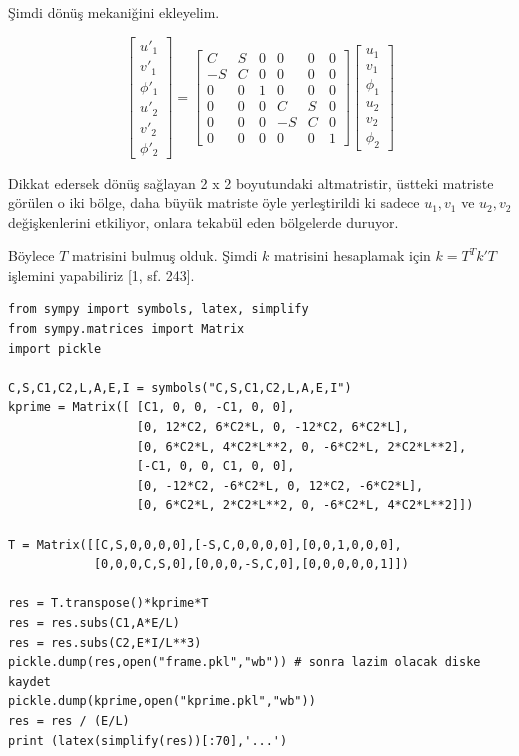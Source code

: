 \documentclass[12pt,fleqn]{article}\usepackage{../../common}
\begin{document}
Şimdi dönüş mekaniğini ekleyelim.

$$
\left[\begin{array}{ccc}
u'_1 \\ v'_1 \\ \phi'_1 \\ u'_2 \\ v'_2 \\ \phi'_2 
\end{array}\right] =
\left[\begin{array}{cccccc}
C & S & 0 & 0 & 0 & 0 \\
-S & C & 0 & 0 & 0 & 0 \\
0 & 0 & 1 & 0 & 0 & 0 \\
0 & 0 & 0 & C & S & 0 \\
0 & 0 & 0 & -S & C & 0 \\
0 & 0 & 0 & 0 & 0 & 1
\end{array}\right]
\left[\begin{array}{ccc}
u_1 \\ v_1 \\ \phi_1 \\ u_2 \\ v_2 \\ \phi_2 
\end{array}\right]
$$

Dikkat edersek dönüş sağlayan 2 x 2 boyutundaki altmatristir, üstteki matriste
görülen o iki bölge, daha büyük matriste öyle yerleştirildi ki sadece $u_1,v_1$
ve $u_2,v_2$ değişkenlerini etkiliyor, onlara tekabül eden bölgelerde duruyor.

Böylece $T$ matrisini bulmuş olduk. Şimdi $k$ matrisini hesaplamak için
$k = T^T k' T$ işlemini yapabiliriz [1, sf. 243].

\begin{verbatim}
from sympy import symbols, latex, simplify
from sympy.matrices import Matrix
import pickle

C,S,C1,C2,L,A,E,I = symbols("C,S,C1,C2,L,A,E,I")
kprime = Matrix([ [C1, 0, 0, -C1, 0, 0],
                  [0, 12*C2, 6*C2*L, 0, -12*C2, 6*C2*L],
                  [0, 6*C2*L, 4*C2*L**2, 0, -6*C2*L, 2*C2*L**2],
                  [-C1, 0, 0, C1, 0, 0],
                  [0, -12*C2, -6*C2*L, 0, 12*C2, -6*C2*L],
                  [0, 6*C2*L, 2*C2*L**2, 0, -6*C2*L, 4*C2*L**2]])

T = Matrix([[C,S,0,0,0,0],[-S,C,0,0,0,0],[0,0,1,0,0,0],
            [0,0,0,C,S,0],[0,0,0,-S,C,0],[0,0,0,0,0,1]])

res = T.transpose()*kprime*T
res = res.subs(C1,A*E/L) 
res = res.subs(C2,E*I/L**3)
pickle.dump(res,open("frame.pkl","wb")) # sonra lazim olacak diske kaydet
pickle.dump(kprime,open("kprime.pkl","wb"))
res = res / (E/L) 
print (latex(simplify(res))[:70],'...')
\end{verbatim}
\end{document}
